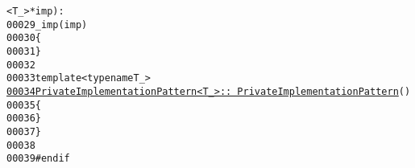 \begin{footnotesize}
\begin{alltt}
      <T\_> * imp) :
00029         \_imp(imp)
00030     \{
00031     \}
00032 
00033     \textcolor{keyword}{template} <\textcolor{keyword}{typename} T\_>
\hypertarget{private__implementation__pattern-impl_8hh_source_l00034}{}\hyperlink{classeos_1_1PrivateImplementationPattern_acf46ec2739c3b0ec9702b9428475876d}{00034}     \hyperlink{classeos_1_1PrivateImplementationPattern_acf46ec2739c3b0ec9702b9428475876d}{PrivateImplementationPattern<T_>::~PrivateImplementationPattern}()
00035     \{
00036     \}
00037 \}
00038 
00039 \textcolor{preprocessor}{#endif}
\end{alltt}\end{footnotesize}
